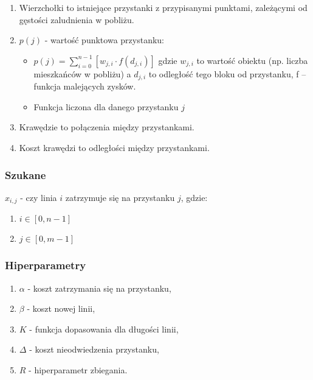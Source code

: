 \documentclass[12pt,a4paper]{article}
\begin{document}
\begin{enumerate}
    \item Wierzchołki to istniejące przystanki z przypisanymi punktami, zależącymi od gęstości zaludnienia w pobliżu.
    \item $p(j)$ - wartość punktowa przystanku:
          \begin{itemize}
              \item $p(j) = \sum_{i=0}^{n-1} \left[ w_{j, i} \cdot f(d_{j, i}) \right]$ gdzie $w_{j, i}$ to wartość obiektu (np. liczba mieszkańców w pobliżu) a $d_{j,i}$ to odległość tego bloku od przystanku, f – funkcja malejących zysków.
              \item Funkcja liczona dla danego przystanku $j$
          \end{itemize}
    \item Krawędzie to połączenia między przystankami.
    \item Koszt krawędzi to odległości między przystankami.
\end{enumerate}










\subsubsection{Szukane}
$x_{i,j}$ - czy linia $i$ zatrzymuje się na przystanku $j$, gdzie:
\begin{enumerate}
    \item $i \in \left[ 0, n-1 \right]$
    \item $j \in \left[ 0, m-1 \right]$
\end{enumerate}

\subsubsection{Hiperparametry}
\begin{enumerate}
    \item $\alpha$ - koszt zatrzymania się na przystanku,
    \item $\beta$ - koszt nowej linii,
    \item $K$ - funkcja dopasowania dla długości linii,
    \item $\Delta$ - koszt nieodwiedzenia przystanku,
    \item $R$ - hiperparametr zbiegania.
\end{enumerate}
\end{document}
